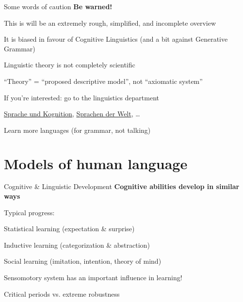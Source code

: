 \documentclass[aspectratio=169,cramped]{beamer}
\let\tempone\itemize
\let\temptwo\enditemize
\renewenvironment{itemize}{\tempone\addtolength{\itemsep}{-0\baselineskip}\addtolength{\parskip}{-0.2\baselineskip}}{\temptwo}
\begin{document}
\begin{frame}{Some words of caution}
  \textbf{Be warned!}
  \begin{itemize}
  \item This is will be an extremely rough, simplified, and incomplete overview
  \item It is biased in favour of Cognitive Linguistics (and a bit against Generative Grammar)
  \item Linguistic theory is not completely scientific
    \begin{itemize}
    \item ``Theory'' = ``proposed descriptive model'', not ``axiomatic system''
    \end{itemize}
  \item If you're interested: go to the linguistics department
    \begin{itemize}
    \item
      \href{https://online.uni-graz.at/kfu_online/wbLv.wbShowLVDetail?pStpSpNr=584778}{Sprache und Kognition}, \href{https://online.uni-graz.at/kfu_online/wbLv.wbShowLVDetail?pStpSpNr=582944&pSpracheNr=1}{Sprachen
      der Welt}, \ldots
    \item Learn more languages (for grammar, not talking)
    \end{itemize}
  \end{itemize}
\end{frame}

\section{Models of human language}

\begin{frame}{Cognitive \& Linguistic Development}
	\textbf{Cognitive abilities develop in similar ways}
	\begin{itemize}
  \item Typical progress:
    \begin{itemize}
    \item Statistical learning (expectation \& surprise)
    \item Inductive learning (categorization \& abstraction)
    \item Social learning (imitation, intention, theory of mind)
    \end{itemize}
  \item Sensomotory system has an important influence in learning!
  \item Critical periods vs. extreme robustness
  \end{itemize}
\end{frame}
\end{document}
